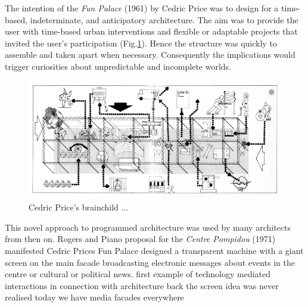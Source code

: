 The intention of the \textit{Fun Palace}  (1961) by Cedric Price was   to design for a time-based, indeterminate, and anticipatory architecture.
The aim was to provide the user with time-based urban interventions and flexible or adaptable projects that invited the user’s participation (Fig.\ref{fun_palace}).
Hence the structure was quickly to assemble and taken apart when necessary.
Consequently the implications would trigger curiosities about unpredictable and incomplete worlds.


\begin{figure} [h!]
    \centering
        \includegraphics[width=\textwidth]{Illustrations/fun_palace.png}
    \caption[Fun Palace, (1961)]{Cedric Price's brainchild ... }
    \label{fun_palace}
\end{figure}


This novel approach to programmed architecture was used by many architects from then on.
Rogers and Piano proposal for the \textit{Centre Pompidou} (1971)  manifested Cedric Prices Fun Palace 
designed a transparent machine with a giant screen on the main facade broadcasting electronic messages about events in the centre or cultural or political news.
first example of technology mediated interactions in connection with architecture
back the screen idea was never realised
today we have media facades everywhere


